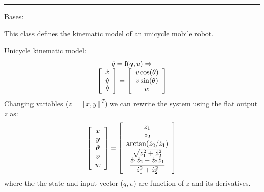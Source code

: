 \documentclass[letterpaper,10pt,english]{sphinxmanual}
\begin{document}
\bigskip\hrule{}\bigskip


\begin{fulllineitems}
\label{Multi-robot motion planner:planning_sim.UnicycleKineModel}
Bases: \href{http://docs.python.org/library/functions.html\#object}{}

This class defines the kinematic model of an unicycle mobile robot.

Unicycle kinematic model:
\begin{gather}
\begin{split}\begin{array}{c}
\dot{q} = \mathrm{f}(q, u) \Rightarrow\\
\left[\begin{array}{c}
\dot{x}\\
\dot{y}\\
\dot{\theta}
\end{array}\right]=
\left[\begin{array}{c}
v\cos(\theta)\\
v\sin(\theta)\\
w
\end{array}\right]
\end{array}\end{split}\notag
\end{gather}
Changing variables (\(z = [x, y]^T\)) we can rewrite the system using the
flat output \(z\) as:
\begin{gather}
\begin{split}\left[\begin{array}{c}
x\\
y\\
\theta\\
v\\
w
\end{array}\right]=
\left[\begin{array}{c}
z_1\\
z_2\\
\arctan(\dot{z}_2/\dot{z}_1)\\
\sqrt{\dot{z}_{1}^{2} + \dot{z}_{2}^{2}}\\
\dfrac{\dot{z}_{1}\ddot{z}_{2} - \dot{z}_{2}\ddot{z}_{1}}{\dot{z}_{1}^{2}+\dot{z}_{2}^{2}}
\end{array}\right]\end{split}\notag
\end{gather}
where the the state and input vector (\(q, v\)) are function of \(z\)
and its derivatives.


\end{fulllineitems}
\end{document}
